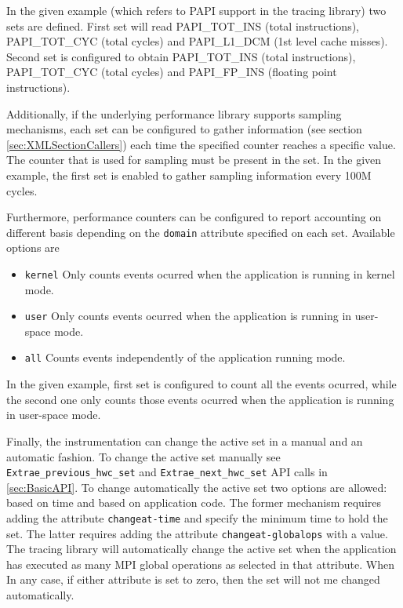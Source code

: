 In the given example (which refers to PAPI support in the tracing library) two sets are defined. First set will read {PAPI\_TOT\_INS} (total instructions), {PAPI\_TOT\_CYC} (total cycles) and {PAPI\_L1\_DCM} (1st level cache misses). Second set is configured to obtain {PAPI\_TOT\_INS} (total instructions), {PAPI\_TOT\_CYC} (total cycles) and {PAPI\_FP\_INS} (floating point instructions).

Additionally, if the underlying performance library supports sampling mechanisms, each set can be configured to gather information (see section \ref{sec:XMLSectionCallers}) each time the specified counter reaches a specific value. The counter that is used for sampling must be present in the set. In the given example, the first set is enabled to gather sampling information every 100M cycles.

Furthermore, performance counters can be configured to report accounting on different basis depending on the {\tt domain} attribute specified on each set. Available options are
\begin{itemize}
 \item {\tt kernel} Only counts events ocurred when the application is running in kernel mode.
 \item {\tt user} Only counts events ocurred when the application is running in user-space mode.
 \item {\tt all} Counts events independently of the application running mode.
\end{itemize}

In the given example, first set is configured to count all the events ocurred, while the second one only counts those events ocurred when the application is running in user-space mode.

Finally, the instrumentation can change the active set in a manual and an automatic fashion. To change the active set manually see {\tt Extrae\_previous\_hwc\_set} and {\tt Extrae\_next\_hwc\_set} API calls in \ref{sec:BasicAPI}. To change automatically the active set two options are allowed: based on time and based on application code. The former mechanism requires adding the attribute {\tt changeat-time} and specify the minimum time to hold the set. The latter requires adding the attribute {\tt changeat-globalops} with a value. The tracing library will automatically change the active set when the application has executed as many MPI global operations as selected in that attribute. When In any case, if either attribute is set to zero, then the set will not me changed automatically.

